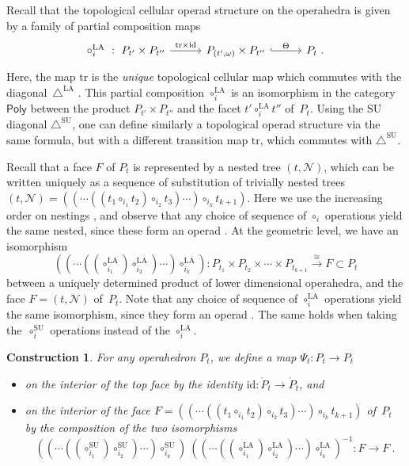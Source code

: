 \documentclass{amsart}
\newtheorem{construction}[theorem]{Construction}
\theoremstyle{definition}
\newcommand{\SU}{\mathrm{SU}}
\newcommand{\LA}{\mathrm{LA}}
\newcommand{\SUD}{\triangle^{\mathrm{SU}}}
\newcommand{\LAD}{\triangle^{\mathrm{LA}}}
\newcommand{\PolySub}{\mathsf{Poly}}
\newcommand{\tr}{\mathrm{tr}}
\newcommand{\id}{\mathrm{id}}
\begin{document}
Recall that the topological cellular operad structure on the operahedra \cite[Def.~4.17]{LaplanteAnfossi} is given by a family of partial composition maps 
\[
\vcenter{\hbox{
\begin{tikzcd}[column sep=1cm]
\circ_i^{\LA}\ : \ P_{t'}\times P_{t''}
\arrow[r,  "\tr\times \id"]
& P_{(t',\omega)}\times P_{t''}
 \arrow[r,hookrightarrow, "\Theta"]
&
P_t \ .
\end{tikzcd}
}}  \]
Here, the map $\tr$ is the \emph{unique} topological cellular map which commutes with the diagonal~$\LAD$ \cite[Prop.~7]{MasudaThomasTonksVallette}. 
This partial composition $\circ_i^\LA$ is an isomorphism in the category $\PolySub$ \cite[Def.~4.13]{LaplanteAnfossi} between the product $P_{t'}\times P_{t''}$ and the facet $t' \circ_i^\LA t''$ of~$P_t$.
Using the $\SU$ diagonal $\SUD$, one can define similarly a topological operad structure via the same formula, but with a different transition map $\tr$, which commutes with $\SUD$.

Recall that a face $F$ of $P_t$ is represented by a nested tree $(t,\mathcal{N})$, which can be written uniquely as a sequence of substitution of trivially nested trees 
$(t,\mathcal{N})=((\cdots((t_1\circ_{i_1} t_2) \circ_{i_2} t_3) \cdots )\circ_{i_k} t_{k+1})$.
Here we use the increasing order on nestings \cite[Def. 4.5]{LaplanteAnfossi}, and observe that any choice of sequence of $\circ_i$ operations yield the same nested, since these form an operad \cite[Def.~4.7]{LaplanteAnfossi}.
At the geometric level, we have an isomorphism
\[((\cdots((\circ_{i_1}^\LA) \circ_{i_2}^\LA) \cdots) \circ_{i_k}^\LA): P_{t_1} \times P_{t_2} \times \cdots \times P_{t_{k+1}} \overset{\cong}{\longrightarrow} F \subset P_t \]
between a uniquely determined product of lower dimensional operahedra, and the face $F=(t,\mathcal{N})$ of~$P_t$.
Note that any choice of sequence of $\circ_i^\LA$ operations yield the same isomorphism, since they form an operad \cite[Thm.~4.18]{LaplanteAnfossi}.
The same holds when taking the~$\circ_i^\SU$ operations instead of the $\circ_i^\LA$. 

\begin{construction}
	\label{const:top-iso}
	For any operahedron $P_t$, we define a map $\Psi_t : P_t \to P_t$ 
	\begin{itemize}
		\item on the interior of the top face by the identity $\id : \mathring P_t \to \mathring P_t$, and 
		\item on the interior of the face $F=((\cdots((t_1 \circ_{i_1} t_2) \circ_{i_2} t_3) \cdots )\circ_{i_k} t_{k+1})$ of~$P_t$ by the composition of the two isomorphisms
		\[ 
		((\cdots ((\circ_{i_1}^\SU) \circ_{i_2}^\SU) \cdots) \circ_{i_k}^\SU) \ ((\cdots((\circ_{i_1}^\LA) \circ_{i_2}^\LA) \cdots) \circ_{i_k}^\LA)^{-1}: F \to F \ . \] 
	\end{itemize}
\end{construction}
\end{document}
